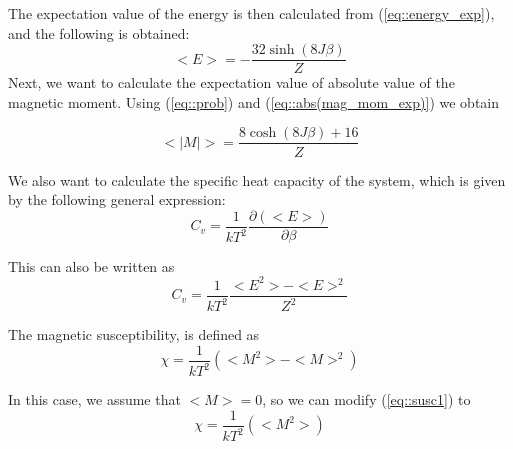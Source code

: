 \documentclass[12pt]{article}
\begin{document}
The expectation value of the energy is then calculated from (\ref{eq::energy_exp}), and the following is obtained: 
\begin{equation}
<E> =-\frac{32\sinh(8J\beta) }{Z} 
\end{equation}
Next, we want to calculate the expectation value of absolute value of the magnetic moment. Using (\ref{eq::prob}) and (\ref{eq::abs(mag_mom_exp)})   we obtain 

\begin{equation}
<|M|> = \frac{8\cosh(8J\beta)+16}{Z}
\end{equation}

We also want to calculate the specific heat capacity of the system, which is given by the following general expression:
\begin{equation}
C_v = \frac{1}{kT^2}\frac{\partial(<E>)}{\partial\beta}
\end{equation}

This can also be written as 
\begin{equation}
C_v = \frac{1}{kT^2}\frac{<E^2>-<E>^2}{Z^2}
\end{equation}

The magnetic susceptibility, is defined as 
\begin{equation}\label{eq::susc1}
\chi = \frac{1}{kT^2}(<M^2>-<M>^2)
\end{equation}

In this case, we assume that $<M> = 0$, so we can modify (\ref{eq::susc1}) to 
\begin{equation}
\chi = \frac{1}{kT^2}(<M^2>)
\end{equation}
\end{document}
